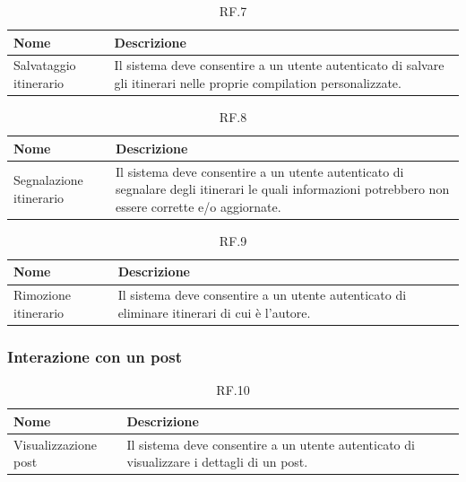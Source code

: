 \documentclass{natourDoc}
\begin{document}
\begin{table}[H]
	\centering
	\begin{tabular}{ |p{5cm}|p{10.3cm}| }
		\hline
		\rowcolor{PineGreen!70}
		\textbf{Nome}          & \textbf{Descrizione}                                                        \\
		\hline
		Salvataggio itinerario & Il sistema deve consentire a un utente autenticato di salvare gli itinerari
		nelle proprie compilation personalizzate.                                                            \\
		\hline
	\end{tabular}
	\caption{RF.7}
	\label{table:7}
\end{table}

\begin{table}[H]
	\centering
	\begin{tabular}{ |p{5cm}|p{10.3cm}| }
		\hline
		\rowcolor{PineGreen!70}
		\textbf{Nome}           & \textbf{Descrizione}                                                            \\
		\hline
		Segnalazione itinerario & Il sistema deve consentire a un utente autenticato di segnalare degli itinerari
		le quali informazioni potrebbero non essere corrette e/o aggiornate.                                      \\
		\hline
	\end{tabular}
	\caption{RF.8}
	\label{table:8}
\end{table}

\begin{table}[H]
	\centering
	\begin{tabular}{ |p{5cm}|p{10.3cm}| }
		\hline
		\rowcolor{PineGreen!70}
		\textbf{Nome}        & \textbf{Descrizione}                                                             \\
		\hline
		Rimozione itinerario & Il sistema deve consentire a un utente autenticato di eliminare itinerari di cui
		è l'autore.                                                                                             \\
		\hline
	\end{tabular}
	\caption{RF.9}
	\label{table:9}
\end{table}

\subsubsection{Interazione con un post}
\begin{table}[H]
	\centering
	\begin{tabular}{ |p{5cm}|p{10.3cm}| }
		\hline
		\rowcolor{PineGreen!70}
		\textbf{Nome}        & \textbf{Descrizione}                                               \\
		\hline
		Visualizzazione post & Il sistema deve consentire a un utente autenticato di visualizzare
		i dettagli di un post.                                                                    \\
		\hline
	\end{tabular}
	\caption{RF.10}
	\label{table:10}
\end{table}
\end{document}
